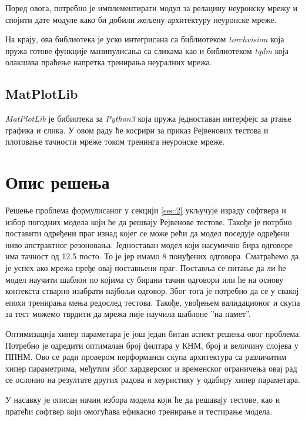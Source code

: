 \documentclass[a4paper, 12pt, master, utf8]{etf}
\begin{document}
Поред овога, потребно је имплементирати модул за релацину неуронску мрежу и спојити дате модуле како би добили жељену архитектуру неуронске мреже.
\newline

На крају, ова библиотека је уско интегрисана са библиотеком \textit{torchvision} која пружа готове функције манипулисања са сликама као и библиотеком \textit{tqdm} 
која олакшава праћење напретка тренирања неуралних мрежа.

\section{MatPlotLib}
\label{sec:33}
\textit{MatPlotLib} је бибиотека за \textit{Python3} која пружа једноставан интерфејс за ртање графика и слика. У овом раду 
ће косрири за приказ Рејвенових тестова и плотовање тачности мреже током тренинга неуронске мреже.


\chapter{Опис решења}
\label{sec:4}

Решење проблема формулисаног у секцији \ref{sec:2} укључује израду софтвера и избор погодних модела који ће да решвају Рејвенове тестове.
Такође је потрбно поставити одређени праг изнад којег се може рећи да модел поседује одређени ниво апстрактног резоновања. Једноставан модел који насумично бира одговоре 
има тачност од 12.5 посто. То је јер имамо 8 понуђених одговора. Сматраћемо да је успех ако мрежа пређе овај поставњени праг. Поставља се питање да ли ће модел научити шаблон по 
којима су бирани тачни одговори или ће на основу контекста стварно изабрати најбољи одговор. Због тога је потребно да се у свакој епохи тренирања мења редослед тестова. Такође, увођењем 
валидационог и скупа за тест можемо тврдити да мрежа није научила шаблоне ”на памет”. 

Оптимизација хипер параметара је још један битан аспект решења овог проблема. Потребно је одредити оптималан број филтара у КНМ, број и величину слојева у ППНМ. 
Ово се ради провером перформанси скупа архитектура са различитим хипер параметрима, међутим због хардверског и временског ограничења овај рад се ослонио на
резултате других радова и хеуристику у одабиру хипер параметара.

У насавку је описан начин избора модела који ће да решавају тестове, као и пратећи софтвер који омогућава ефикасно тренирање и тестирање модела.
\end{document}
